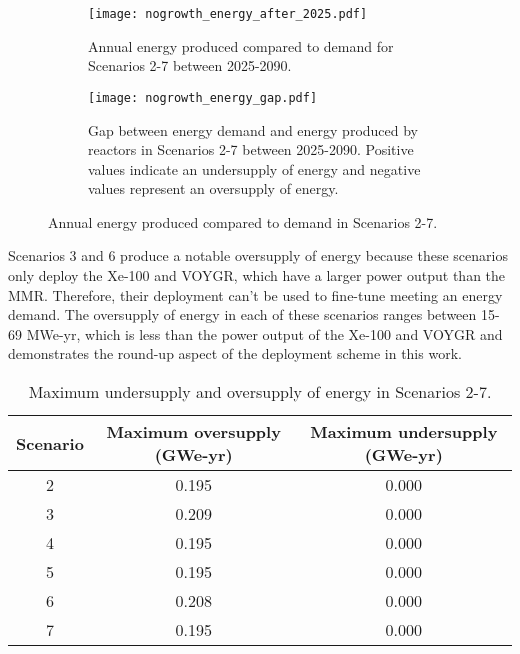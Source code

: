 \begin{figure}[h!]
    \centering
    \begin{subfigure}{0.45\textwidth}
        \centering
        \texttt{[image: nogrowth\_energy\_after\_2025.pdf]}
        \caption{Annual energy produced compared to demand for Scenarios 2-7
        between 2025-2090.}
        \label{fig:nogrowth_energy_after_2025}
    \end{subfigure}
    \hfill
    \begin{subfigure}{0.45\textwidth}
        \centering
        \texttt{[image: nogrowth\_energy\_gap.pdf]}
        \caption{Gap between energy demand and energy produced by reactors 
        in Scenarios 2-7 between 2025-2090. Positive values indicate an 
        undersupply of energy and negative values represent an 
        oversupply of energy.}
        \label{fig:nogrowth_energy_gap}
    \end{subfigure}
       \caption{Annual energy produced compared to demand in Scenarios 2-7.}
       \label{fig:nogrowth_energy}
\end{figure}

Scenarios 3 and 6 produce a notable 
oversupply of energy because these scenarios only deploy the Xe-100 and VOYGR,
which have a larger power output than the \gls{MMR}. Therefore,
their deployment can't be used to fine-tune meeting an energy demand. The oversupply 
of energy in each of these scenarios ranges between 15-69 MWe-yr, which is less 
than the power output of the Xe-100 and VOYGR and demonstrates the round-up 
aspect of the deployment scheme in this work. 

\begin{table}[h!]
    \centering
    \caption{Maximum undersupply and oversupply of energy in Scenarios 2-7.}
    \label{tab:nogrowth_energy}
    \begin{tabular}{c c c}
        \hline 
        Scenario & Maximum oversupply (GWe-yr) & Maximum undersupply (GWe-yr) \\
        \hline 
        2 & 0.195 & 0.000 \\
        3 & 0.209 & 0.000 \\
        4 & 0.195 & 0.000 \\
        5 & 0.195 & 0.000 \\
        6 & 0.208 & 0.000 \\
        7 & 0.195 & 0.000 \\
        \hline
        
    \end{tabular}
\end{table}

